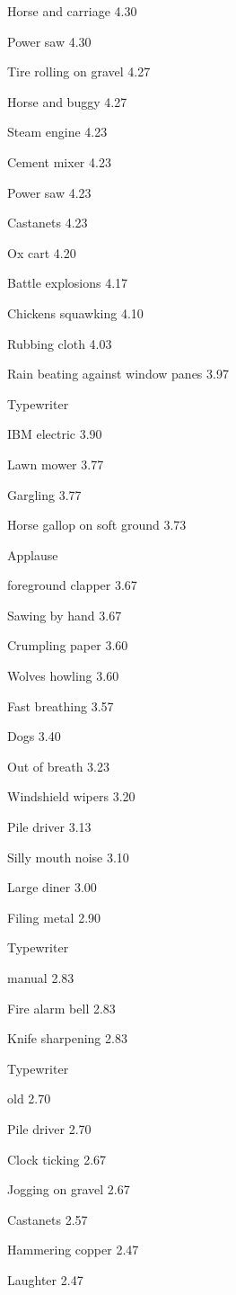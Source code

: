 \documentclass{sig-alternate-05-2015}
\begin{document}
{ Horse and carriage
4.30 

 Power saw
4.30 

 Tire rolling on gravel
4.27 

 Horse and buggy
4.27 

 Steam engine
4.23 

 Cement mixer
4.23 

 Power saw
4.23 

 Castanets
4.23 

 Ox cart
4.20 

 Battle explosions
4.17 

 Chickens squawking
4.10 

 Rubbing cloth
4.03 

 Rain beating against window panes
3.97 

 Typewriter 

 IBM electric
3.90 

 Lawn mower
3.77 

 Gargling
3.77 

 Horse gallop on soft ground
3.73 

 Applause 

 foreground clapper
3.67 

 Sawing by hand
3.67 

 Crumpling paper
3.60 

 Wolves howling
3.60 

 Fast breathing
3.57 

 Dogs
3.40 

 Out of breath
3.23 

 Windshield wipers
3.20 

 Pile driver
3.13 

 Silly mouth noise
3.10 

 Large diner
3.00 

 Filing metal
2.90 

 Typewriter 

 manual
2.83 

 Fire alarm bell
2.83 

 Knife sharpening
2.83 

 Typewriter 

 old
2.70 

 Pile driver
2.70 

 Clock ticking
2.67 

 Jogging on gravel
2.67 

 Castanets
2.57 

 Hammering copper
2.47 

 Laughter
2.47 

}
\end{document}
